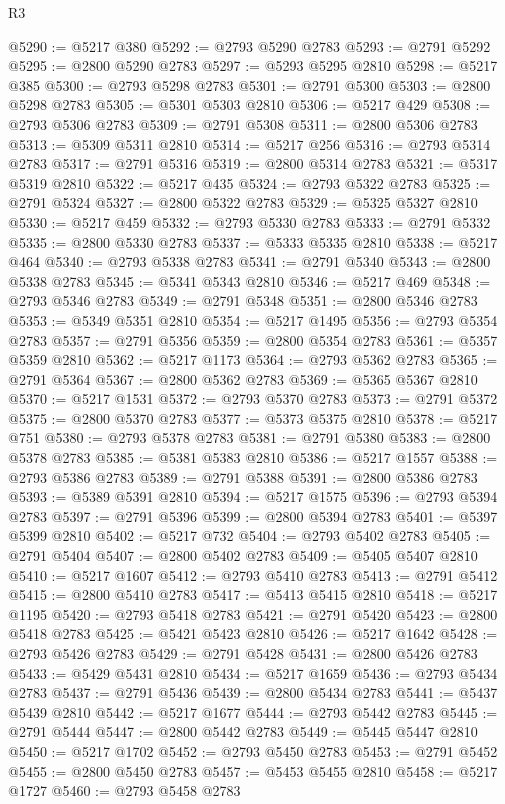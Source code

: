 \begin{lexlean}{R3}
\begin{coremodule}
@5290 := @5217 @380
@5292 := @2793 @5290 @2783
@5293 := @2791 @5292
@5295 := @2800 @5290 @2783
@5297 := @5293 @5295 @2810
@5298 := @5217 @385
@5300 := @2793 @5298 @2783
@5301 := @2791 @5300
@5303 := @2800 @5298 @2783
@5305 := @5301 @5303 @2810
@5306 := @5217 @429
@5308 := @2793 @5306 @2783
@5309 := @2791 @5308
@5311 := @2800 @5306 @2783
@5313 := @5309 @5311 @2810
@5314 := @5217 @256
@5316 := @2793 @5314 @2783
@5317 := @2791 @5316
@5319 := @2800 @5314 @2783
@5321 := @5317 @5319 @2810
@5322 := @5217 @435
@5324 := @2793 @5322 @2783
@5325 := @2791 @5324
@5327 := @2800 @5322 @2783
@5329 := @5325 @5327 @2810
@5330 := @5217 @459
@5332 := @2793 @5330 @2783
@5333 := @2791 @5332
@5335 := @2800 @5330 @2783
@5337 := @5333 @5335 @2810
@5338 := @5217 @464
@5340 := @2793 @5338 @2783
@5341 := @2791 @5340
@5343 := @2800 @5338 @2783
@5345 := @5341 @5343 @2810
@5346 := @5217 @469
@5348 := @2793 @5346 @2783
@5349 := @2791 @5348
@5351 := @2800 @5346 @2783
@5353 := @5349 @5351 @2810
@5354 := @5217 @1495
@5356 := @2793 @5354 @2783
@5357 := @2791 @5356
@5359 := @2800 @5354 @2783
@5361 := @5357 @5359 @2810
@5362 := @5217 @1173
@5364 := @2793 @5362 @2783
@5365 := @2791 @5364
@5367 := @2800 @5362 @2783
@5369 := @5365 @5367 @2810
@5370 := @5217 @1531
@5372 := @2793 @5370 @2783
@5373 := @2791 @5372
@5375 := @2800 @5370 @2783
@5377 := @5373 @5375 @2810
@5378 := @5217 @751
@5380 := @2793 @5378 @2783
@5381 := @2791 @5380
@5383 := @2800 @5378 @2783
@5385 := @5381 @5383 @2810
@5386 := @5217 @1557
@5388 := @2793 @5386 @2783
@5389 := @2791 @5388
@5391 := @2800 @5386 @2783
@5393 := @5389 @5391 @2810
@5394 := @5217 @1575
@5396 := @2793 @5394 @2783
@5397 := @2791 @5396
@5399 := @2800 @5394 @2783
@5401 := @5397 @5399 @2810
@5402 := @5217 @732
@5404 := @2793 @5402 @2783
@5405 := @2791 @5404
@5407 := @2800 @5402 @2783
@5409 := @5405 @5407 @2810
@5410 := @5217 @1607
@5412 := @2793 @5410 @2783
@5413 := @2791 @5412
@5415 := @2800 @5410 @2783
@5417 := @5413 @5415 @2810
@5418 := @5217 @1195
@5420 := @2793 @5418 @2783
@5421 := @2791 @5420
@5423 := @2800 @5418 @2783
@5425 := @5421 @5423 @2810
@5426 := @5217 @1642
@5428 := @2793 @5426 @2783
@5429 := @2791 @5428
@5431 := @2800 @5426 @2783
@5433 := @5429 @5431 @2810
@5434 := @5217 @1659
@5436 := @2793 @5434 @2783
@5437 := @2791 @5436
@5439 := @2800 @5434 @2783
@5441 := @5437 @5439 @2810
@5442 := @5217 @1677
@5444 := @2793 @5442 @2783
@5445 := @2791 @5444
@5447 := @2800 @5442 @2783
@5449 := @5445 @5447 @2810
@5450 := @5217 @1702
@5452 := @2793 @5450 @2783
@5453 := @2791 @5452
@5455 := @2800 @5450 @2783
@5457 := @5453 @5455 @2810
@5458 := @5217 @1727
@5460 := @2793 @5458 @2783

\end{coremodule}
\end{lexlean}

